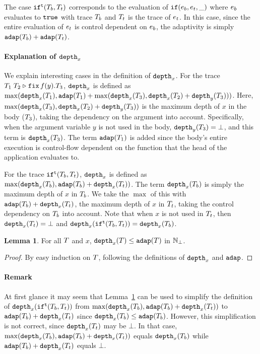\documentclass[a4paper,11pt]{article}
\theoremstyle{definition}
\newtheorem{lem}[thm]{Lemma}
\begin{document}
The case $\mathtt{if}^{\mathtt{t}}(T_b, T_t)$ corresponds to the evaluation of
$\mathtt{if}(e_b, e_t, \_)$ where $e_b$ evaluates to $\mathtt{true}$
with trace $T_b$ and $T_t$ is the trace of $e_t$. In this
case, since the entire evaluation of $e_t$ is control dependent on
$e_b$, the adaptivity is simply $\mathtt{adap}(T_b) + \mathtt{adap}(T_t)$.

\paragraph{Explanation of $\mathtt{depth}_{x}$}
We explain interesting cases in the definition of $\mathtt{depth}_{x}$.  For the
trace $T_1 \; T_2 \mathrel{\triangleright} {\mathop{\mathtt{fix}} f(y).T_3}$, $\mathtt{depth}_{x}$ is defined as
$\max(\mathtt{depth}_{x}(T_1), \mathtt{adap}(T_1) + \max(\mathtt{depth}_{x}(T_3),
\mathtt{depth}_{x}(T_2) + \mathtt{depth}_{y}(T_3)))$. Here, $\max(\mathtt{depth}_{x}(T_3),
\mathtt{depth}_{x}(T_2) + \mathtt{depth}_{y}(T_3))$ is the maximum depth of $x$ in the
body ($T_3$), taking the dependency on the argument into
account. Specifically, when the argument variable $y$ is not used in
the body, $\mathtt{depth}_{y}(T_3) = \bot$, and this term is
$\mathtt{depth}_{x}(T_3)$.  The term $\mathtt{adap}(T_1)$ is added since the body's
entire execution is control-flow dependent on the function that the
head of the application evaluates to.

For the trace $\mathtt{if}^{\mathtt{t}}(T_b, T_t)$, $\mathtt{depth}_{x}$ is defined as
$\max(\mathtt{depth}_{x}(T_b), \mathtt{adap}(T_b) + \mathtt{depth}_{x}(T_t))$. The term
$\mathtt{depth}_{x}(T_b)$ is simply the maximum depth of $x$ in $T_b$. We
take the $\max$ of this with $\mathtt{adap}(T_b) + \mathtt{depth}_{x}(T_t)$, the
maximum depth of $x$ in $T_t$, taking the control dependency on
$T_b$ into account. Note that when $x$ is not used in $T_t$, then
$\mathtt{depth}_{x}(T_t) = \bot$ and $\mathtt{depth}_{x}(\mathtt{if}^{\mathtt{t}}(T_b, T_t)) =
\mathtt{depth}_{x}(T_b)$.

\begin{lem}\label{lem:ddep-leq-adap}
For all $T$ and $x$, $\mathtt{depth}_{x}(T) \leq \mathtt{adap}(T)$ in $\mathbb{N}_{\bot}$.
\end{lem}
%
\begin{proof}
By easy induction on $T$, following the definitions of $\mathtt{depth}_{x}$
and $\mathtt{adap}$.
\end{proof}



\paragraph{Remark}
At first glance it may seem that Lemma~\ref{lem:ddep-leq-adap} can be
used to simplify the definition of $\mathtt{depth}_{x}(\mathtt{if}^{\mathtt{t}}(T_b, T_t))$
from $\max(\mathtt{depth}_{x}(T_b), \mathtt{adap}(T_b) + \mathtt{depth}_{x}(T_t))$ to
$\mathtt{adap}(T_b) + \mathtt{depth}_{x}(T_t)$ since $\mathtt{depth}_{x}(T_b) \leq
\mathtt{adap}(T_b)$. However, this simplification is not correct, since
$\mathtt{depth}_{x}(T_t)$ may be $\bot$. In that case, $\max(\mathtt{depth}_{x}(T_b),
\mathtt{adap}(T_b) + \mathtt{depth}_{x}(T_t))$ equals $\mathtt{depth}_{x}(T_b)$ while
$\mathtt{adap}(T_b) + \mathtt{depth}_{x}(T_t)$ equals $\bot$.
\end{document}
